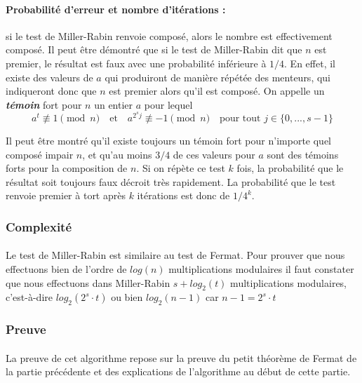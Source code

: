 	
		\paragraph{Probabilité d'erreur et nombre d'itérations :} si le test de Miller-Rabin renvoie composé, alors le nombre est effectivement composé. Il peut être démontré que si le test de Miller-Rabin dit que $n$ est premier, le résultat est faux avec une probabilité inférieure à $1/4$. En effet, il existe des valeurs de $a$ qui produiront de manière répétée des menteurs, qui indiqueront donc que $n$ est premier alors qu'il est composé. On appelle un \textit{\textbf{témoin}} fort pour $n$ un entier $a$ pour lequel
		\[a^{t} \not\equiv 1 \pmod n \quad \text{et} \quad a^{2^{s}j} \not\equiv -1 \pmod n \quad \text{pour tout } j \in \{0, ..., s - 1\}\]
		
		Il peut être montré qu'il existe toujours un témoin fort pour n'importe quel composé impair $n$, et qu'au moins $3/4$ de ces valeurs pour $a$ sont des témoins forts pour la composition de $n$. Si on répète ce test $k$ fois, la probabilité que le résultat soit toujours faux décroit très rapidement. La probabilité que le test renvoie premier à tort après $k$ itérations est donc de $1/4^{k}$.
		
	\subsubsection{Complexité}
		\paragraph{}Le test de Miller-Rabin est similaire au test de Fermat. Pour prouver que nous effectuons bien de l'ordre de $log(n)$ multiplications modulaires il faut constater que nous effectuons dans Miller-Rabin $s + log_{2}(t)$ multiplications modulaires, c'est-à-dire $log_{2}(2^{s} \cdot t)$ ou bien $log_{2}(n - 1)$ car $n - 1 = 2^{s} \cdot t$
		
	\subsubsection{Preuve}
		\paragraph{}La preuve de cet algorithme repose sur la preuve du petit théorème de Fermat de la partie précédente et des explications de l'algorithme au début de cette partie.
		
